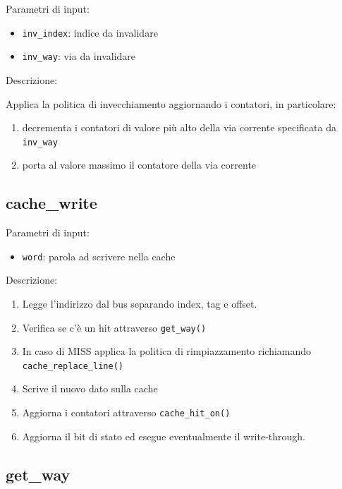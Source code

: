 Parametri di input:
\begin{itemize}
  \item \texttt{inv\_index}: indice da invalidare
  \item \texttt{inv\_way}: via da invalidare
\end{itemize}

Descrizione:

Applica la politica di invecchiamento aggiornando i contatori, in particolare:
\begin{enumerate}
  \item decrementa i contatori di valore pi\`u alto della via corrente specificata da \texttt{inv\_way}
  \item porta al valore massimo il contatore della via corrente
\end{enumerate}	
	

\subsection{cache\_write} %

Parametri di input:
\begin{itemize}
  \item \texttt{word}: parola ad scrivere nella cache

\end{itemize}

Descrizione:	
\begin{enumerate}
  \item Legge l'indirizzo dal bus separando index, tag e offset. 
  
  \item Verifica se c'\`e un hit attraverso \texttt{get\_way()}
  \item In caso di MISS applica la politica di rimpiazzamento richiamando \texttt{cache\_replace\_line()}
  \item Scrive il nuovo dato sulla cache
  \item Aggiorna i contatori attraverso \texttt{cache\_hit\_on()}
  \item Aggiorna il bit di stato ed esegue eventualmente il write-through.
\end{enumerate}
		


\subsection{get\_way} %

